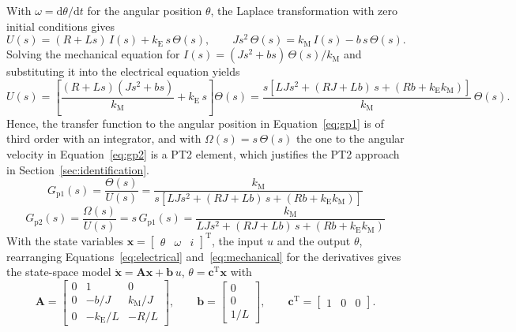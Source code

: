 \noindent
With $\omega = \mathrm{d}\theta/\mathrm{d}t$ for the angular position $\theta$,
the Laplace transformation with zero initial conditions gives
\begin{equation*}
  U(s) = (R + L s)\, I(s) + k_\mathrm{E}\, s\, \Theta(s), \qquad
  J s^2\, \Theta(s) = k_\mathrm{M}\, I(s) - b\, s\, \Theta(s).
\end{equation*}
Solving the mechanical equation for $I(s) = (J s^2 + b s)\,\Theta(s)/k_\mathrm{M}$
and substituting it into the electrical equation yields
\begin{equation*}
  U(s) = \left[ \frac{(R + L s)(J s^2 + b s)}{k_\mathrm{M}} + k_\mathrm{E}\, s \right] \Theta(s)
  = \frac{s \left[ L J s^2 + (R J + L b)\, s + (R b + k_\mathrm{E} k_\mathrm{M}) \right]}
         {k_\mathrm{M}}\, \Theta(s).
\end{equation*}
Hence, the transfer function to the angular position in Equation~\eqref{eq:gp1}
is of third order with an integrator, and with $\Omega(s) = s\,\Theta(s)$ the one
to the angular velocity in Equation~\eqref{eq:gp2} is a PT2 element, which
justifies the PT2 approach in Section~\ref{sec:identification}.
\begin{equation}
  G_\mathrm{p1}(s) = \frac{\Theta(s)}{U(s)}
  = \frac{k_\mathrm{M}}{s \left[ L J s^2 + (R J + L b)\, s + (R b + k_\mathrm{E} k_\mathrm{M}) \right]}
  \label{eq:gp1}
\end{equation}
\begin{equation}
  G_\mathrm{p2}(s) = \frac{\Omega(s)}{U(s)} = s\,G_\mathrm{p1}(s)
  = \frac{k_\mathrm{M}}{L J s^2 + (R J + L b)\, s + (R b + k_\mathrm{E} k_\mathrm{M})}
  \label{eq:gp2}
\end{equation}
With the state variables
$\mathbf{x} = \begin{bmatrix} \theta & \omega & i \end{bmatrix}^\mathrm{T}$,
the input $u$ and the output $\theta$, rearranging Equations~\eqref{eq:electrical}
and~\eqref{eq:mechanical} for the derivatives gives the state-space model
$\dot{\mathbf{x}} = \mathbf{A}\mathbf{x} + \mathbf{b}\,u$,
$\theta = \mathbf{c}^\mathrm{T}\mathbf{x}$ with
\begin{equation*}
  \mathbf{A} =
  \begin{bmatrix}
    0 & 1 & 0 \\
    0 & -b/J & k_\mathrm{M}/J \\
    0 & -k_\mathrm{E}/L & -R/L
  \end{bmatrix}, \qquad
  \mathbf{b} = \begin{bmatrix} 0 \\ 0 \\ 1/L \end{bmatrix}, \qquad
  \mathbf{c}^\mathrm{T} = \begin{bmatrix} 1 & 0 & 0 \end{bmatrix}.
\end{equation*}

